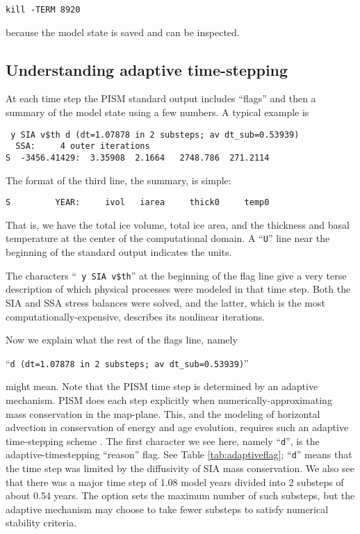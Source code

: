 \verb|kill -TERM 8920|

\noindent because the model state is saved and can be inspected.



\subsection{Understanding adaptive time-stepping} \label{subsect:adapt} At each time step the PISM standard output includes ``flags'' and then a summary of the model state using a few numbers.  A typical example is
\small
\begin{verbatim}
 y SIA v$th d (dt=1.07878 in 2 substeps; av dt_sub=0.53939)
  SSA:     4 outer iterations
S  -3456.41429:  3.35908  2.1664   2748.786  271.2114
\end{verbatim}
\normalsize
\noindent The format of the third line, the summary, is simple:
\small
\begin{verbatim}
S         YEAR:     ivol   iarea     thick0     temp0
\end{verbatim}
\normalsize
That is, we have the total ice volume, total ice area, and the thickness and basal temperature at the center of the computational domain.  A ``\verb|U|'' line near the beginning of the standard output indicates the units.

The characters ``\verb| y SIA v$th|'' at the beginning of the flag line give a very terse description of which physical processes were modeled in that time step.  Both the SIA and SSA stress balances were solved, and the latter, which is the most computationally-expensive, describes its nonlinear iterations.

Now we explain what the rest of the flags line, namely

``\verb|d (dt=1.07878 in 2 substeps; av dt_sub=0.53939)|''

\noindent might mean.  Note that the PISM time step is determined by an adaptive mechanism.  PISM does each step explicitly when numerically-approximating mass conservation in the map-plane.  This, and the modeling of horizontal advection in conservation of energy and age evolution, requires such an adaptive time-stepping scheme \cite{BBL}.  The first character we see here, namely ``\verb|d|'', is the adaptive-timestepping ``reason'' flag.  See Table \ref{tab:adaptiveflag}; ``\verb|d|'' means that the time step was limited by the diffusivity of SIA mass conservation.  We also see that there was a major time step of 1.08 model years divided into 2 substeps of about 0.54 years.  The  option sets the maximum number of such substeps, but the adaptive mechanism may choose to take fewer substeps to satisfy numerical stability criteria.

